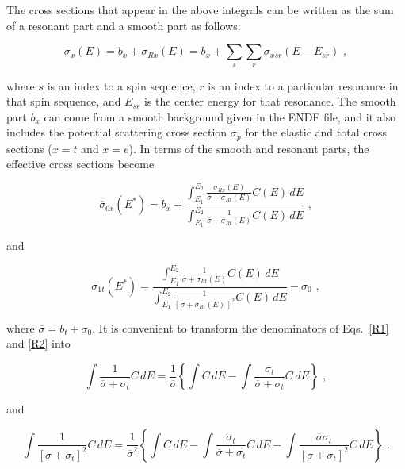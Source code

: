 The cross sections that appear in the above integrals can be
written as the sum of a resonant part and a smooth part as
follows:

\begin{equation}
  \sigma_x(E)=b_x+\sigma_{Rx}(E)
    =b_x+\sum_s\sum_r\sigma_{xsr}(E{-}E_{sr})\,\,,
\end{equation}

\noindent
where $s$ is an index to a spin sequence, $r$ is an index to
a particular resonance in that spin sequence, and $E_{sr}$ is
the center energy for that resonance.  The smooth part $b_x$
can come from a smooth background given in the ENDF file,
and it also includes the potential scattering cross section
 $\sigma_p$ for the elastic and
total cross sections ($x{=}t$ and $x{=}e$).  In terms of the
smooth and resonant parts, the effective cross sections become

\begin{equation}
   \overline{\sigma}_{0x}(E^*)=b_x+\displaystyle\frac
     {\displaystyle\int_{E_1}^{E_2}
        \frac{\sigma_{Rx}(E)}{\overline{\sigma}+\sigma_{Rt}(E)}C(E)\,dE}
     {\displaystyle\int_{E_1}^{E_2}
        \frac{1}{\overline{\sigma}+\sigma_{Rt}(E)}C(E)\,dE}\,\,,
\label{R1}
\end{equation}

\noindent
and

\begin{equation}
   \overline{\sigma}_{1t}(E^*)=\displaystyle\frac
     {\displaystyle\int_{E_1}^{E_2}
        \frac{1}{\overline{\sigma}+\sigma_{Rt}(E)}C(E)\,dE}
     {\displaystyle\int_{E_1}^{E_2}
        \frac{1}{[\,\overline{\sigma}+\sigma_{Rt}(E)\,]^2}C(E)\,dE}
     - \sigma_0\,\,,
\label{R2}
\end{equation}

\noindent
where $\overline{\sigma}=b_t+\sigma_0$.  It is convenient to
transform the denominators of Eqs.~\ref{R1} and \ref{R2} into

\begin{equation}
   \int\frac{1}{\overline{\sigma}+\sigma_t}C\,dE
    =\frac{1}{\overline{\sigma}}\left\{
     \int C\,dE-\int\frac{\sigma_t}
        {\overline{\sigma}+\sigma_t}C\,dE\right\}\,\,,
\end{equation}

\noindent
and

\begin{equation}
   \int\frac{1}{[\overline{\sigma}+\sigma_t]^2}C\,dE
    =\frac{1}{\overline{\sigma}^2}\left\{
     \int C\,dE-\int\frac{\sigma_t}
            {\overline{\sigma}+\sigma_t}C\,dE
      -\int\frac{\overline{\sigma}\sigma_t}
        {[\overline{\sigma}+\sigma_t]^2}C\,dE\right\}\,\,.
\end{equation}

